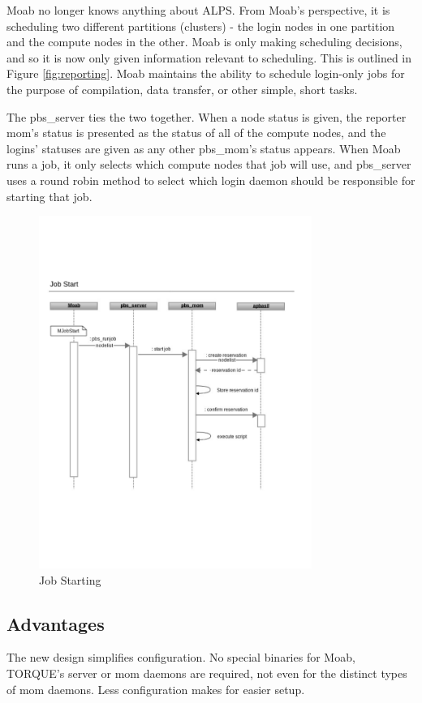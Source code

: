 Moab no longer knows anything about ALPS. From Moab's perspective, it is
scheduling two different partitions (clusters) - the login nodes in one
partition and the compute nodes in the other. Moab is only making scheduling
decisions, and so it is now only given information relevant to scheduling. This
is outlined in Figure \ref{fig:reporting}. Moab maintains the ability to
schedule login-only jobs for the purpose of compilation, data transfer, or
other simple, short tasks.

The pbs_server ties the two together. When a node status is given, the reporter
mom's status is presented as the status of all of the compute nodes, and the
logins' statuses are given as any other pbs_mom's status appears. When Moab
runs a job, it only selects which compute nodes that job will use, and
pbs_server uses a round robin method to select which login daemon should be
responsible for starting that job.

\begin{figure}
  \centering
  \includegraphics[width=3.5in]{figures/job-start.pdf}
  \caption{Job Starting}\label{fig:starting}
\end{figure}

\subsection{Advantages}

The new design simplifies configuration. No special binaries for Moab, TORQUE's
server or mom daemons are required, not even for the distinct types of mom
daemons. Less configuration makes for easier setup.

